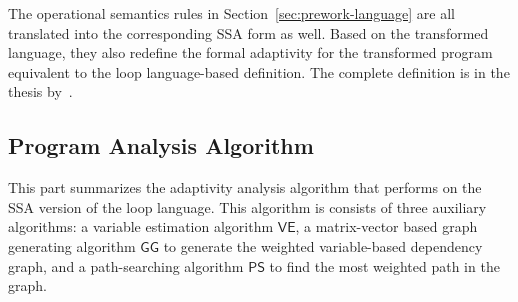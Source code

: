 The operational semantics rules
in Section~\ref{sec:prework-language} are all translated into the corresponding SSA form as well.
Based on the transformed language, they also redefine the formal adaptivity for the transformed program equivalent to the
loop language-based definition. The complete definition is in the thesis by~\cite{weihao22}.
%
\subsection{Program Analysis Algorithm}
This part summarizes 
the adaptivity analysis algorithm that performs on the SSA version of the loop language.
This algorithm is
consists of three auxiliary algorithms:
a variable estimation algorithm $\mathsf{VE}$, a matrix-vector based graph generating algorithm $\mathsf{GG}$ to generate the weighted variable-based dependency graph, and a path-searching algorithm $\mathsf{PS}$ to find the most weighted path in the graph.
%
